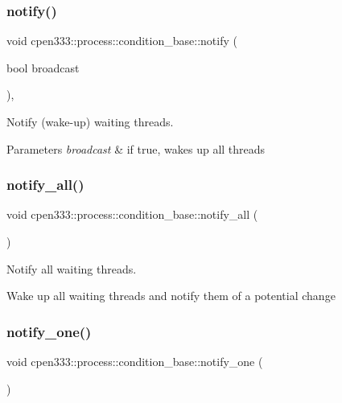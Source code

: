 \subsubsection{\texorpdfstring{notify()}{notify()}}
{\footnotesize\ttfamily void cpen333\+::process\+::condition\+\_\+base\+::notify (\begin{DoxyParamCaption}\item[{bool}]{broadcast }\end{DoxyParamCaption})\hspace{0.3cm}{\ttfamily [inline]}, {\ttfamily [protected]}}



Notify (wake-\/up) waiting threads. 


\begin{DoxyParams}{Parameters}
{\em broadcast} & if true, wakes up all threads \\
\hline
\end{DoxyParams}
\mbox{\label{classcpen333_1_1process_1_1condition__base_a37b38d480898c0cc13b0ea1eb2b24127}} 
\subsubsection{\texorpdfstring{notify\+\_\+all()}{notify\_all()}}
{\footnotesize\ttfamily void cpen333\+::process\+::condition\+\_\+base\+::notify\+\_\+all (\begin{DoxyParamCaption}{ }\end{DoxyParamCaption})\hspace{0.3cm}{\ttfamily [inline]}}



Notify all waiting threads. 

Wake up all waiting threads and notify them of a potential change \mbox{\label{classcpen333_1_1process_1_1condition__base_a990220c8ee064b3d494cdbf238ceb73e}} 
\subsubsection{\texorpdfstring{notify\+\_\+one()}{notify\_one()}}
{\footnotesize\ttfamily void cpen333\+::process\+::condition\+\_\+base\+::notify\+\_\+one (\begin{DoxyParamCaption}{ }\end{DoxyParamCaption})\hspace{0.3cm}{\ttfamily [inline]}}



